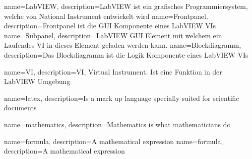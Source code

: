 

{
	name=LabVIEW,
	description={LabVIEW ist ein grafisches Programmiersystem, welche von National Instrument entwickelt wird}
}
{
	name=Frontpanel,
	description={Frontpanel ist die GUI Komponente eines LabVIEW \gls{VI}s}
}
{
name=Subpanel,
description={\gls{LabVIEW} GUI Element mit welchem ein Laufendes \gls{VI} in dieses Element geladen werden kann.}
}
{
name=Blockdiagramm,
description={Das Blockdiagramm ist die Logik Komponente eines LabVIEW \gls{VI}s}
}

{
	name=VI,
	description={VI, Virtual Instrument. Ist eine Funktion in der LabVIEW Umgebung}
}







{
	name=latex,
	description={Is a mark up language specially suited for scientific documents}
}

{
	name=mathematics,
	description={Mathematics is what mathematicians do}
}

{
	name=formula,
	description={A mathematical expression}
}
{
	name=formula,
	description={A mathematical expression}
}

